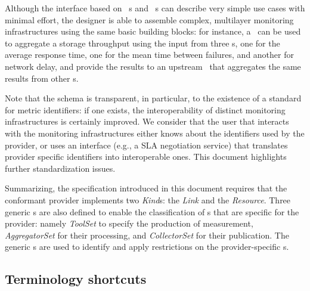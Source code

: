 \documentclass[12pt]{article}  %
\begin{document}
Although the interface based on \sens\ s and \coll\ s can describe very simple use cases with minimal effort, the designer is able to assemble complex, multilayer monitoring infrastructures using the same basic building blocks: for instance, a \sens\ can be used to aggregate a storage throughput using the input from three \coll s, one for the average response time, one for the mean time between failures, and another for network delay, and provide the results to an upstream \sens\ that aggregates the same results from other \sens s.


Note that the schema is transparent, in particular, to the existence of a standard for metric identifiers: if one exists, the interoperability of distinct monitoring infrastructures is certainly improved. We consider that the user that interacts with the monitoring infrastructures either knows about the identifiers used by the provider, or uses an interface (e.g., a SLA negotiation service) that translates provider specific identifiers into interoperable ones. This document highlights further standardization issues.

Summarizing, the specification introduced in this document requires that the conformant provider implements two {\em Kind}s: the {\em \coll Link} and the {\em \sens Resource}. Three generic \mi s are also defined to enable the classification of \mi s that are specific for the provider: namely {\em ToolSet} to specify the production of measurement, {\em AggregatorSet} for their processing, and {\em CollectorSet} for their publication. The generic \mi s are used to identify and apply restrictions on the provider-specific \mi s. 

\subsection{Terminology shortcuts}
\end{document}
